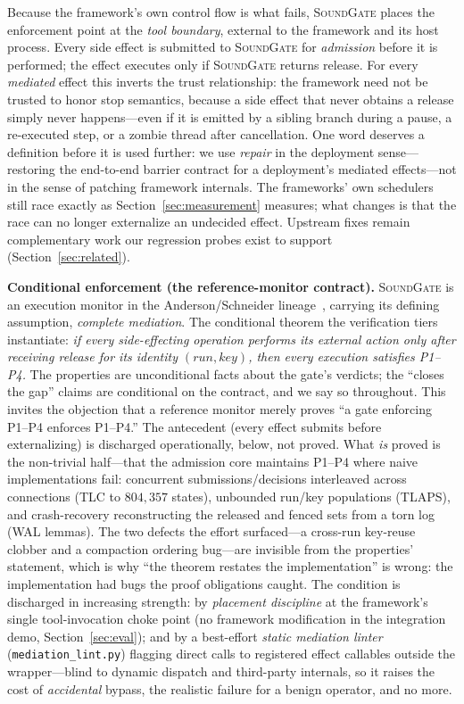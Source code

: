 \documentclass[10pt,journal,compsoc]{IEEEtran}
\newcommand{\sys}{\textsc{SoundGate}}
\begin{document}
Because the framework's own control flow is what fails, \sys{} places the
enforcement point at the \emph{tool boundary}, external to the framework and its
host process. Every side effect is submitted to \sys{} for \emph{admission}
before it is performed; the effect executes only if \sys{} returns
\textsf{release}. For every \emph{mediated} effect this inverts the trust
relationship: the framework need not be trusted to honor stop semantics,
because a side effect that never obtains a release simply never happens---even
if it is emitted by a sibling branch during a pause, a re-executed step, or a
zombie thread after cancellation. One word deserves a definition before it is
used further: we use \emph{repair} in the deployment sense---restoring the
end-to-end barrier contract for a deployment's mediated effects---not in the
sense of patching framework internals. The frameworks' own schedulers still
race exactly as Section~\ref{sec:measurement} measures; what changes is that
the race can no longer externalize an undecided effect. Upstream fixes remain
complementary work our regression probes exist to support
(Section~\ref{sec:related}).

\noindent\textbf{Conditional enforcement (the reference-monitor contract).}
\sys{} is an execution monitor in the Anderson/Schneider
lineage~\cite{anderson72,schneider00}, carrying its defining assumption,
\emph{complete mediation}. The conditional theorem the verification tiers
instantiate: \emph{if every side-effecting operation performs its external
action only after receiving \textsf{release} for its identity
$(\mathit{run},\mathit{key})$, then every execution satisfies P1--P4.} The
properties are unconditional facts about the gate's verdicts; the ``closes the
gap'' claims are conditional on the contract, and we say so throughout. This
invites the objection that a reference monitor merely proves ``a gate enforcing
P1--P4 enforces P1--P4.'' The antecedent (every effect submits before
externalizing) is discharged operationally, below, not proved. What \emph{is}
proved is the non-trivial half---that the admission core maintains P1--P4 where
naive implementations fail: concurrent submissions/decisions interleaved across
connections (TLC to $804{,}357$ states), unbounded run/key populations (TLAPS),
and crash-recovery reconstructing the released and fenced sets from a torn log
(WAL lemmas). The two defects the effort surfaced---a cross-run key-reuse
clobber and a compaction ordering bug---are invisible from the properties'
statement, which is why ``the theorem restates the implementation'' is wrong:
the implementation had bugs the proof obligations caught. The condition is
discharged in increasing strength: by \emph{placement discipline} at the
framework's single tool-invocation choke point (no framework modification in
the integration demo, Section~\ref{sec:eval}); and by a best-effort
\emph{static mediation linter} (\texttt{mediation\_lint.py}) flagging direct
calls to registered effect callables outside the wrapper---blind to dynamic
dispatch and third-party internals, so it raises the cost of \emph{accidental}
bypass, the realistic failure for a benign operator, and no more.
\end{document}
